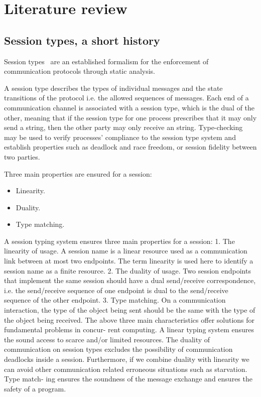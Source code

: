 \section{Literature review}
\label{litreview}


\subsection{Session types, a short history}
\label{st}


Session types~\cite{HondaK:typdi, HondaK:intblt1, HondaK:lanptd} are an established formalism for the enforcement of communication protocols through static analysis.



A session type describes the types of individual messages and the state transitions of the protocol i.e. the allowed sequences of messages. Each end of a communication channel is associated with a session type, which is the dual of the other, meaning that if the session type for one process prescribes that it may only send a string, then the other party may only receive an string. Type-checking may be used to verify processes’ compliance to the session type system and establish properties such as deadlock and race freedom, or session fidelity between two parties.

Three main properties are ensured for a session:
\begin{itemize}
	\item Linearity.
  \item Duality.
	\item Type matching.
\end{itemize}

A session typing system ensures three main properties for a session:
1. The linearity of usage. A session name is a linear resource used as a communication link between at most two endpoints. The term linearity is used here to identify a session name as a finite resource.
2. The duality of usage. Two session endpoints that implement the same session should have a dual send/receive correspondence, i.e. the send/receive sequence of one endpoint is dual to the send/receive sequence of the other endpoint.
3. Type matching. On a communication interaction, the type of the object being sent should be the same with the type of the object being received.
The above three main characteristics offer solutions for fundamental problems in concur- rent computing. A linear typing system ensures the sound access to scarce and/or limited resources. The duality of communication on session types excludes the possibility of communication deadlocks inside a session. Furthermore, if we combine duality with linearity we can avoid other communication related erroneous situations such as starvation. Type match- ing ensures the soundness of the message exchange and ensures the safety of a program.




